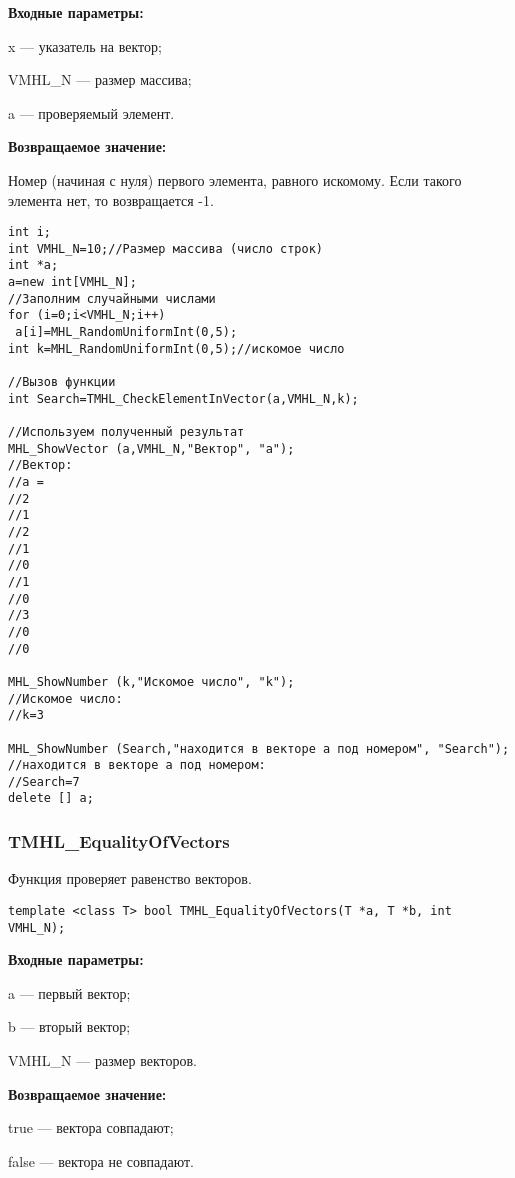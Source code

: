 \documentclass[a4paper,12pt]{article}
\begin{document}
\textbf{Входные параметры:}

   x --- указатель на вектор;
   
 VMHL\_N --- размер массива;
 
 a --- проверяемый элемент.

\textbf{Возвращаемое значение:}

 Номер (начиная с нуля) первого элемента, равного искомому. Если такого элемента нет, то возвращается -1.


\begin{lstlisting}[label=code_use_TMHL_CheckElementInVector,caption=Пример использования]
int i;
int VMHL_N=10;//Размер массива (число строк)
int *a;
a=new int[VMHL_N];
//Заполним случайными числами
for (i=0;i<VMHL_N;i++)
 a[i]=MHL_RandomUniformInt(0,5);
int k=MHL_RandomUniformInt(0,5);//искомое число

//Вызов функции
int Search=TMHL_CheckElementInVector(a,VMHL_N,k);

//Используем полученный результат
MHL_ShowVector (a,VMHL_N,"Вектор", "a");
//Вектор:
//a =
//2
//1
//2
//1
//0
//1
//0
//3
//0
//0

MHL_ShowNumber (k,"Искомое число", "k");
//Искомое число:
//k=3

MHL_ShowNumber (Search,"находится в векторе a под номером", "Search");
//находится в векторе a под номером:
//Search=7
delete [] a;
\end{lstlisting}

\subsubsection{TMHL\_EqualityOfVectors}\label{TMHL_EqualityOfVectors}

Функция проверяет равенство векторов.


\begin{lstlisting}[label=code_syntax_TMHL_EqualityOfVectors,caption=Синтаксис]
template <class T> bool TMHL_EqualityOfVectors(T *a, T *b, int VMHL_N);
\end{lstlisting}

\textbf{Входные параметры:}

  a --- первый вектор;
  
 b --- вторый вектор;
 
 VMHL\_N --- размер векторов.

\textbf{Возвращаемое значение:}

 true --- вектора совпадают;
 
 false --- вектора не совпадают.
\end{document}
